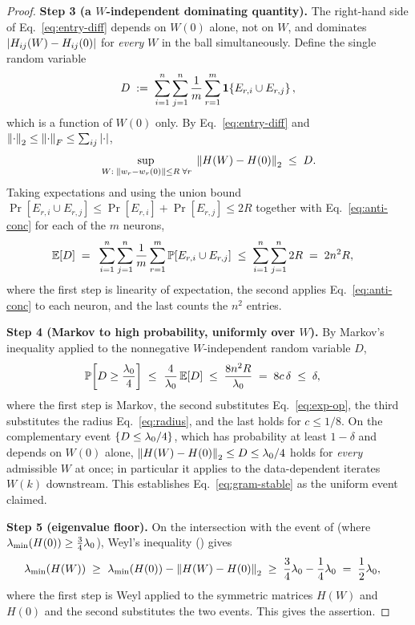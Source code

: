 \begin{proof}
\smallskip\noindent\textbf{Step 3 (a $W$-independent dominating quantity).}
The right-hand side of Eq.~\eqref{eq:entry-diff} depends on $W(0)$ alone, not on $W$, and
dominates $\left| H_{ij}(W)-H_{ij}(0) \right|$ for \emph{every} $W$ in the ball simultaneously. Define
the single random variable
\begin{align}\label{eq:dom-quantity}
D \;:=\; \sum_{i=1}^{n}\sum_{j=1}^{n} \frac{1}{m}\sum_{r=1}^{m}
\mathbf{1}\!\left\{ E_{r,i} \cup E_{r,j} \right\},
\end{align}
which is a function of $W(0)$ only. By Eq.~\eqref{eq:entry-diff} and
$\left\| \cdot \right\|_{2} \le \left\| \cdot \right\|_{F} \le \sum_{ij}\left| \cdot \right|$,
\begin{align}\label{eq:dom-sup}
\sup_{\,W :\; \left\| w_r-w_r(0) \right\|\le R\;\forall r}\; \left\| H(W)-H(0) \right\|_{2} \;\le\; D .
\end{align}
Taking expectations
and using the union bound $\Pr[E_{r,i}\cup E_{r,j}] \le \Pr[E_{r,i}] + \Pr[E_{r,j}] \le 2R$
together with Eq.~\eqref{eq:anti-conc} for each of the $m$ neurons,
\begin{align}\label{eq:exp-op}
\mathbb{E}[D]
\;=\; & ~ \sum_{i=1}^{n}\sum_{j=1}^{n} \frac{1}{m}\sum_{r=1}^{m}
\mathbb{P}\!\left[ E_{r,i} \cup E_{r,j} \right]
\;\le\; \sum_{i=1}^{n}\sum_{j=1}^{n} 2R
\;=\; 2 n^2 R,
\end{align}
where the first step is linearity of expectation, the second applies Eq.~\eqref{eq:anti-conc}
to each neuron, and the last counts the $n^2$ entries.

\smallskip\noindent\textbf{Step 4 (Markov to high probability, uniformly over $W$).}
By Markov's inequality applied to the nonnegative $W$-independent random variable $D$,
\begin{align}\label{eq:markov-stab}
\mathbb{P}\!\left[ D \ge \frac{\lambda_{0}}{4} \right]
\;\le\; & ~ \frac{4}{\lambda_{0}}\, \mathbb{E}[D]
\;\le\; \frac{8 n^2 R}{\lambda_{0}}
\;=\; 8 c\, \delta
\;\le\; \delta,
\end{align}
where the first step is Markov, the second substitutes Eq.~\eqref{eq:exp-op}, the third
substitutes the radius Eq.~\eqref{eq:radius}, and the last holds for $c \le 1/8$. On the
complementary event $\{D \le \lambda_{0}/4\}$, which has probability at least $1-\delta$ and depends
on $W(0)$ alone, $\left\| H(W)-H(0) \right\|_{2} \le D \le \lambda_{0}/4$ holds for \emph{every} admissible $W$
at once; in particular it applies to the data-dependent iterates $W(k)$ downstream. This
establishes Eq.~\eqref{eq:gram-stable} as the uniform event claimed.

\smallskip\noindent\textbf{Step 5 (eigenvalue floor).}
On the intersection with the event of  (where
$\lambda_{\min}(H(0)) \ge \tfrac34\lambda_{0}$), Weyl's inequality () gives
\begin{align}\label{eq:weyl-stab}
\lambda_{\min}\!\left( H(W) \right)
\;\ge\; & ~ \lambda_{\min}\!\left( H(0) \right) - \left\| H(W) - H(0) \right\|_{2}
\;\ge\; \frac{3}{4}\lambda_{0} - \frac{1}{4}\lambda_{0}
\;=\; \frac{1}{2}\lambda_{0},
\end{align}
where the first step is Weyl applied to the symmetric matrices $H(W)$ and $H(0)$ and the
second substitutes the two events. This gives the assertion.
\end{proof}
